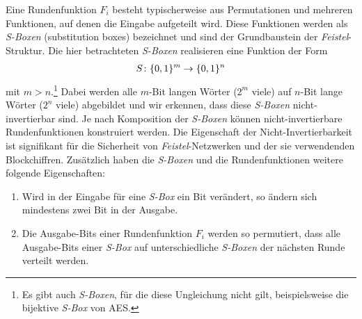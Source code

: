 Eine Rundenfunktion \(F_i\) besteht typischerweise aus Permutationen und mehreren Funktionen, auf denen die Eingabe aufgeteilt wird. Diese Funktionen werden als \textit{S-Boxen} (substitution boxes) bezeichnet und sind der Grundbaustein der \textit{Feistel}-Struktur. Die hier betrachteten \textit{S-Boxen} realisieren eine Funktion der Form
\begin{align*}
	S \colon \{0, 1\}^m \rightarrow \{0, 1\}^n
\end{align*}
mit \(m > n\).\footnote{Es gibt auch \textit{S-Boxen}, für die diese Ungleichung nicht gilt, beispielsweise die bijektive \textit{S-Box} von AES.} Dabei werden alle $m$-Bit langen Wörter (\(2^m\) viele) auf $n$-Bit lange Wörter (\(2^n\) viele) abgebildet und wir erkennen, dass diese \textit{S-Boxen} nicht-invertierbar sind. Je nach Komposition der \textit{S-Boxen} können nicht-invertierbare Rundenfunktionen konstruiert werden. Die Eigenschaft der Nicht-Invertierbarkeit ist signifikant für die Sicherheit von \textit{Feistel}-Netzwerken und der sie verwendenden Blockchiffren. Zusätzlich haben die \textit{S-Boxen} und die Rundenfunktionen weitere folgende Eigenschaften:

\begin{enumerate}
	\item Wird in der Eingabe für eine \textit{S-Box} ein Bit verändert, so ändern sich mindestens zwei Bit in der Ausgabe.
	\item Die Ausgabe-Bits einer Rundenfunktion $F_i$ werden so permutiert, dass alle Ausgabe-Bits einer \textit{S-Box} auf unterschiedliche \textit{S-Boxen} der nächsten Runde verteilt werden.
\end{enumerate}

